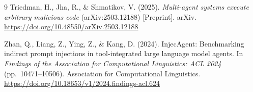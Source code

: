 \documentclass[11pt,a4paper]{article}
\begin{document}
\begin{thebibliography}{9}
Triedman, H., Jha, R., \& Shmatikov, V. (2025). \emph{Multi-agent systems execute arbitrary malicious code} (arXiv:2503.12188) [Preprint]. arXiv. \url{https://doi.org/10.48550/arXiv.2503.12188}

Zhan, Q., Liang, Z., Ying, Z., \& Kang, D. (2024). InjecAgent: Benchmarking indirect prompt injections in tool-integrated large language model agents. In \emph{Findings of the Association for Computational Linguistics: ACL 2024} (pp.~10471--10506). Association for Computational Linguistics. \url{https://doi.org/10.18653/v1/2024.findings-acl.624}

\end{thebibliography}
\end{document}
